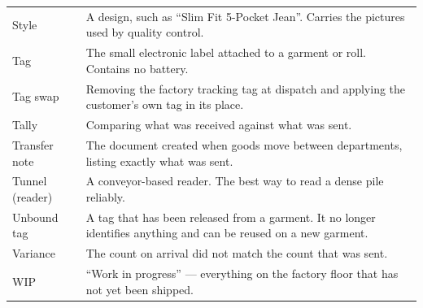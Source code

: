 \begin{longtable}{@{}p{40mm}p{98mm}@{}}
Style &
  A design, such as ``Slim Fit 5-Pocket Jean''. Carries the pictures used by
  quality control. \\

Tag &
  The small electronic label attached to a garment or roll. Contains no battery. \\

Tag swap &
  Removing the factory tracking tag at dispatch and applying the customer's own
  tag in its place. \\

Tally &
  Comparing what was received against what was sent. \\

Transfer note &
  The document created when goods move between departments, listing exactly what
  was sent. \\

Tunnel (reader) &
  A conveyor-based reader. The best way to read a dense pile reliably. \\

Unbound tag &
  A tag that has been released from a garment. It no longer identifies anything
  and can be reused on a new garment. \\

Variance &
  The count on arrival did not match the count that was sent. \\

WIP &
  ``Work in progress'' --- everything on the factory floor that has not yet been
  shipped. \\

\end{longtable}
